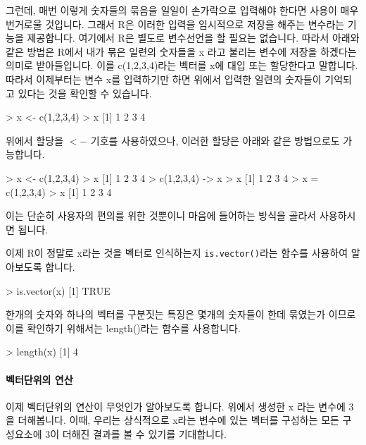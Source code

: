 그런데, 매번 이렇게 숫자들의 묶음을 일일이 손가락으로 입력해야 한다면 사용이 매우 번거로울 것입니다. 
그래서 R은 이러한 입력을 임시적으로 저장을 해주는 변수라는 기능을 제공합니다. 여기에서 R은 별도로 변수선언을 할 필요는 없습니다.
따라서 아래와 같은 방법은 R에서 내가 묶은 일련의 숫자들을 x 라고 불리는 변수에 저장을 하겠다는 의미로 받아들입니다.
이를 c(1,2,3,4)라는 벡터를 x에 대입 또는 할당한다고 말합니다.
따라서 이제부터는 변수 x를 입력하기만 하면 위에서 입력한 일련의 숫자들이 기억되고 있다는 것을 확인할 수 있습니다. 

\begin{Schunk}
\begin{Soutput}
> x <- c(1,2,3,4)
> x
[1] 1 2 3 4
\end{Soutput}
\end{Schunk}

위에서 할당을 $<-$ 기호를 사용하였으나, 이러한 할당은 아래와 같은 방법으로도 가능합니다. 

\begin{Schunk}
	\begin{Soutput}
> x <- c(1,2,3,4)
> x
[1] 1 2 3 4
> c(1,2,3,4) -> x
> x
[1] 1 2 3 4
> x = c(1,2,3,4)		
> x
[1] 1 2 3 4
\end{Soutput}
\end{Schunk}

이는 단순히 사용자의 편의를 위한 것뿐이니 마음에 들어하는 방식을 골라서 사용하시면 됩니다. 

이제 R이 정말로 x라는 것을 벡터로 인식하는지 \texttt{is.vector()}라는 함수를 사용하여 알아보도록 합니다. 

\begin{Schunk}
\begin{Soutput}
> is.vector(x)
[1] TRUE
\end{Soutput}
\end{Schunk}

한개의 숫자와 하나의 벡터를 구분짓는 특징은 몇개의 숫자들이 한데 묶였는가 이므로 이를 확인하기 위해서는 length()라는 함수를 사용합니다. 

\begin{Schunk}
\begin{Soutput}
> length(x)
[1] 4
\end{Soutput}
\end{Schunk}

\paragraph{벡터단위의 연산}  이제 벡터단위의 연산이 무엇인가 알아보도록 합니다. 
위에서 생성한 x 라는 변수에 3 을 더해봅니다. 
이때, 우리는 상식적으로 x라는 변수에 있는 벡터를 구성하는 모든 구성요소에 3이 더해진 결과를 볼 수 있기를 기대합니다. 

